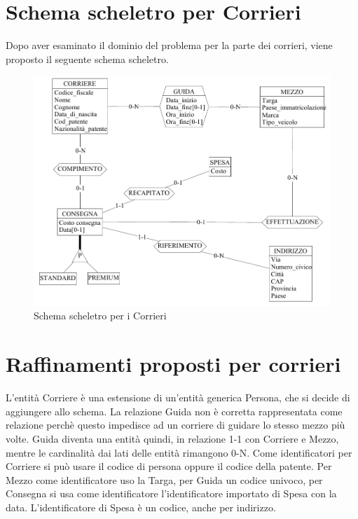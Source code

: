 \documentclass[a4paper,12pt]{report}
\begin{document}
\section{Schema scheletro per Corrieri}
Dopo aver esaminato il dominio del problema per la parte dei corrieri, viene proposto il seguente schema scheletro.
\begin{figure}[h]
	\centering{}
	\includegraphics[width=\textwidth]{img/SchemaConcettuale-Corrieri1.pdf}
	\caption{Schema scheletro per i Corrieri}
\end{figure}
\section{Raffinamenti proposti per corrieri}
L'entità Corriere è una estensione di un'entità generica Persona, che si decide di aggiungere allo schema. 
La relazione Guida non è corretta rappresentata come relazione perchè questo impedisce ad un corriere di guidare lo stesso mezzo più volte. Guida diventa una entità quindi, in relazione 1-1 con Corriere e Mezzo, mentre le cardinalità dai lati delle entità rimangono 0-N. 
Come identificatori per Corriere si può usare il codice di persona oppure il codice della patente. 
Per Mezzo come identificatore uso la Targa, per Guida un codice univoco, per Consegna si usa come identificatore l'identificatore importato di Spesa con la data. 
L'identificatore di Spesa è un codice, anche per indirizzo.
\end{document}
